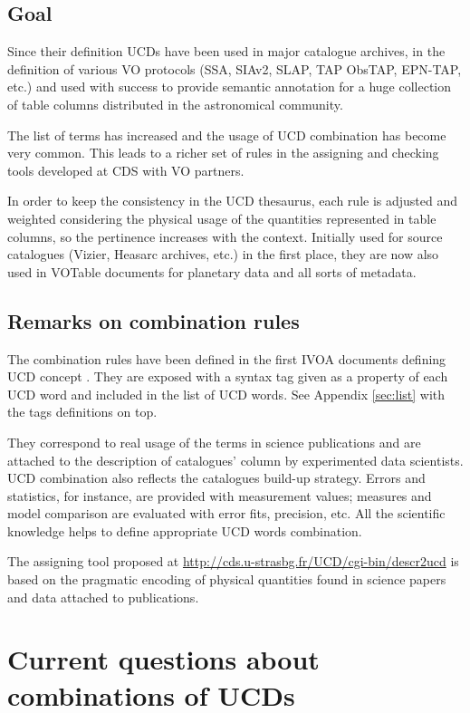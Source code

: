 \documentclass[11pt,a4paper]{ivoa}
\begin{document}
\subsection{Goal}
Since their definition UCDs have been used in major catalogue archives, in the definition of various
VO protocols (SSA, SIAv2, SLAP, TAP ObsTAP, EPN-TAP, etc.) and used with success to provide semantic
annotation for a huge collection of table columns distributed in the astronomical community.

The list of terms has increased and the usage of UCD combination has become very common. This leads
to a richer set of rules in the assigning and checking tools developed at CDS with VO partners.

In order to keep the consistency in the UCD thesaurus, each rule is adjusted and weighted considering 
the physical usage of the quantities represented in table columns, so the pertinence increases with 
the context. Initially used for source catalogues (Vizier, Heasarc archives, etc.) in the first place, 
they are now also used in VOTable documents for planetary data \citep{wd:epntap,erard-vespa} and all sorts of metadata.

\subsection{Remarks on combination rules}
The combination rules have been defined in the first IVOA documents defining UCD concept
\citep{std:UCD}. They are exposed with a syntax tag given as a property of each UCD word 
and included in the list of UCD words. See Appendix \ref{sec:list} with the tags definitions on top.

They correspond to real usage of the terms in science publications and are attached to the description 
of catalogues’ column by experimented data scientists. UCD combination also reflects the catalogues 
build-up strategy. Errors and statistics, for instance, are provided with measurement values; measures 
and model comparison are evaluated with error fits, precision, etc. All the scientific knowledge helps 
to define appropriate UCD words combination.

The assigning tool proposed at \url{http://cds.u-strasbg.fr/UCD/cgi-bin/descr2ucd} is based on the
pragmatic encoding of physical quantities found in science papers and data attached to publications.

\appendix
\section{Current questions about combinations of UCDs}
\end{document}
